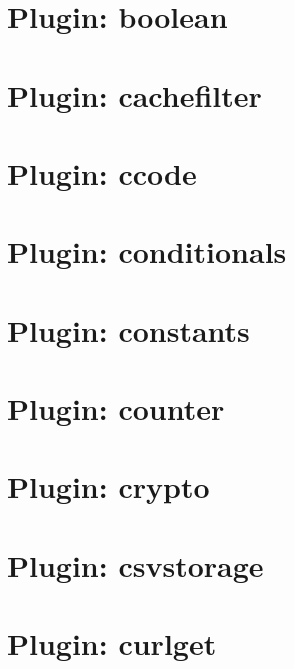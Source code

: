 \documentclass[twoside]{book}
\newcommand{\+}{\discretionary{\mbox{\scriptsize$\hookleftarrow$}}{}{}}
\begin{document}
\chapter{Plugin\+: boolean}
\label{md_src_plugins_boolean_README}
\hypertarget{md_src_plugins_boolean_README}{}

\chapter{Plugin\+: cachefilter}
\label{md_src_plugins_cachefilter_README}
\hypertarget{md_src_plugins_cachefilter_README}{}

\chapter{Plugin\+: ccode}
\label{md_src_plugins_ccode_README}
\hypertarget{md_src_plugins_ccode_README}{}

\chapter{Plugin\+: conditionals}
\label{md_src_plugins_conditionals_README}
\hypertarget{md_src_plugins_conditionals_README}{}

\chapter{Plugin\+: constants}
\label{md_src_plugins_constants_README}
\hypertarget{md_src_plugins_constants_README}{}

\chapter{Plugin\+: counter}
\label{md_src_plugins_counter_README}
\hypertarget{md_src_plugins_counter_README}{}

\chapter{Plugin\+: crypto}
\label{md_src_plugins_crypto_README}
\hypertarget{md_src_plugins_crypto_README}{}

\chapter{Plugin\+: csvstorage}
\label{md_src_plugins_csvstorage_README}
\hypertarget{md_src_plugins_csvstorage_README}{}

\chapter{Plugin\+: curlget}
\label{md_src_plugins_curlget_README}
\hypertarget{md_src_plugins_curlget_README}{}

\end{document}
